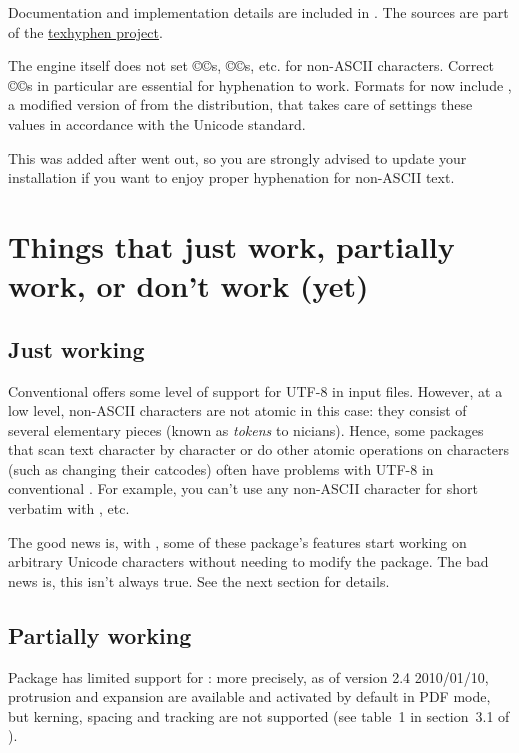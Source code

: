 \documentclass{lltxdoc}
\begin{document}
Documentation and implementation details are included in
. The sources are part of the
\href{http://tug.org/tex-hyphen/}{texhyphen project}.

The engine itself does not set ©\catcode©s, ©\lccode©s, etc. for non-ASCII
characters. Correct ©\lccode©s in particular are essential for hyphenation to
work. Formats for \luatex now include , a
modified version of  from the \xetex distribution,
that takes care of settings these values in accordance with the Unicode
standard.

This was added after  went out, so you are strongly advised to
update your installation if you want to enjoy proper hyphenation for non-ASCII
text.


\section{Things that just work, partially work, or don't work (yet)}
\label{workornot}

\subsection{Just working}\label{working}

Conventional \latex offers some level of support for UTF-8 in input files.
However, at a low level, non-ASCII characters are not atomic in this case:
they consist of several elementary pieces (known as \emph{tokens} to
\tex{}nicians). Hence, some packages that scan text character by character or
do other atomic operations on characters (such as changing their catcodes)
often have problems with UTF-8 in conventional \latex. For example, you can't
use any non-ASCII character for short verbatim with , etc.

The good news is, with \lualatex, some of these package's features start
working on arbitrary Unicode characters without needing to modify the package.
The bad news is, this isn't always true. See the next section for details.

\subsection{Partially working}\label{partial}

Package  has limited support for \luatex: more precisely, as of
version 2.4 2010/01/10, protrusion and expansion are available and activated
by default in PDF mode, but kerning, spacing and tracking are not supported
(see table~1 in section~3.1 of ).
\end{document}

